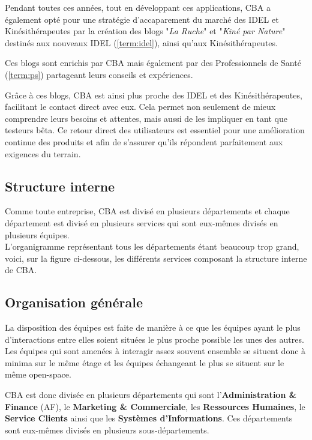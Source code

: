 \documentclass{article}
\begin{document}
Pendant toutes ces années, tout en développant ces applications, CBA a également opté pour une stratégie d'accaparement du marché des IDEL et Kinésithérapeutes par la création des blogs "\textit{La Ruche}" et "\textit{Kiné par Nature}" destinés aux nouveaux IDEL (\ref{term:idel}), ainsi qu'aux Kinésithérapeutes.

Ces blogs sont enrichis par CBA mais également par des Professionnels de Santé (\ref{term:ps}) partageant leurs conseils et expériences.

Grâce à ces blogs, CBA est ainsi plus proche des IDEL et des Kinésithérapeutes, facilitant le contact direct avec eux. Cela permet non seulement de mieux comprendre leurs besoins et attentes, mais aussi de les impliquer en tant que testeurs bêta. Ce retour direct des utilisateurs est essentiel pour une amélioration continue des produits et afin de s'assurer qu'ils répondent parfaitement aux exigences du terrain.

\newpage

\subsection{Structure interne}

Comme toute entreprise, CBA est divisé en plusieurs départements et chaque département est divisé en plusieurs services qui sont eux-mêmes divisés en plusieurs équipes. \\

L'organigramme représentant tous les départements étant beaucoup trop grand, voici, sur la figure ci-dessous, les différents services composant la structure interne de CBA.


\subsection{Organisation générale}

La disposition des équipes est faite de manière à ce que les équipes ayant le plus d'interactions entre elles soient situées le plus proche possible les unes des autres. Les équipes qui sont amenées à interagir assez souvent ensemble se situent donc à minima sur le même étage et les équipes échangeant le plus se situent sur le même open-space.

CBA est donc divisée en plusieurs départements qui sont l'\textbf{Administration \& Finance} (AF), le \textbf{Marketing \& Commerciale}, les \textbf{Ressources Humaines}, le \textbf{Service Clients} ainsi que les \textbf{Systèmes d'Informations}. Ces départements sont eux-mêmes divisés en plusieurs sous-départements. 
\end{document}
